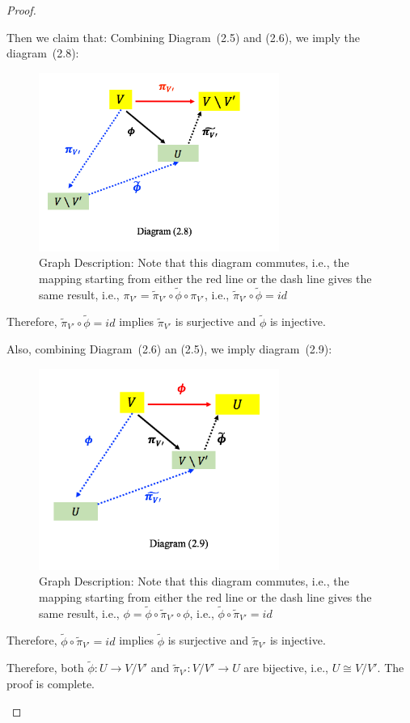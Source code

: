 \begin{proof}
\begin{enumerate}
Then we claim that: Combining Diagram~(2.5) and (2.6), we imply the diagram~(2.8):
\begin{figure}[H]
\centering
\includegraphics[width=0.7\textwidth]{week4/p_7}
\caption*{Graph Description: Note that this diagram commutes, i.e., the mapping starting from either the red line or the dash line gives the same result, i.e., $\pi_{V'} = \tilde{\pi}_{V'}\circ\tilde{\phi}\circ\pi_{V'}$, i.e., $\tilde{\pi}_{V'}\circ\tilde{\phi}=id$}
\end{figure}
Therefore, $\tilde{\pi}_{V'}\circ\tilde{\phi}=id$ implies $\tilde{\pi}_{V'}$ is surjective and $\tilde{\phi}$ is injective.

Also, combining Diagram~(2.6) an (2.5), we imply diagram~(2.9):
\begin{figure}[H]
\centering
\includegraphics[width=0.7\textwidth]{week4/p_8}
\caption*{Graph Description: Note that this diagram commutes, i.e., the mapping starting from either the red line or the dash line gives the same result, i.e., $\phi = \tilde{\phi}\circ\tilde{\pi}_{V'}\circ\phi$, i.e., $ \tilde{\phi}\circ\tilde{\pi}_{V'}=id$}
\end{figure}
Therefore, $\tilde{\phi}\circ\tilde{\pi}_{V'}=id$ implies $\tilde{\phi}$ is surjective and $\tilde{\pi}_{V'}$ is injective.

Therefore, both $\tilde{\phi}:U\to V/ V'$ and $\tilde{\pi}_{V'}:V/ V'\to U$ are bijective, i.e., $U\cong V/ V'$. The proof is complete.
\end{enumerate}
\end{proof}

